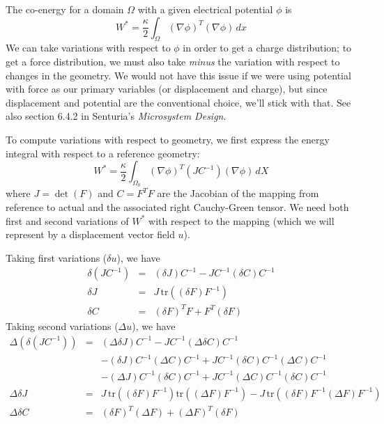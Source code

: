 \documentclass{article}
\begin{document}
The co-energy for a domain $\Omega$ with a given electrical
potential $\phi$ is
\[
W^* = \frac{\kappa}{2} 
\int_{\Omega} (\nabla \phi)^T (\nabla \phi) \, dx
\]
We can take variations with respect to $\phi$ in order to
get a charge distribution; to get a force distribution, we must also
take {\em minus} the variation with respect to changes in the
geometry.  We would not have this issue if we were using potential
with force as our primary variables (or displacement and charge),
but since displacement and potential are the conventional choice,
we'll stick with that.  See also section 6.4.2 in Senturia's
{\em Microsystem Design}.

To compute variations with respect to geometry, we first express
the energy integral with respect to a reference geometry:
\[
W^* = \frac{\kappa}{2} 
\int_{\Omega_0} (\nabla \phi)^T (JC^{-1}) (\nabla \phi) \, dX
\]
where $J = \det(F)$ and $C = F^T F$ are the Jacobian of the mapping from
reference to actual and the associated right Cauchy-Green tensor.
We need both first and second variations of $W^*$ with respect to the
mapping (which we will represent by a displacement vector field $u$).

Taking first variations ($\delta u$), we have
\begin{eqnarray*}
\delta (JC^{-1}) & = & (\delta J) C^{-1} - J C^{-1} (\delta C) C^{-1} \\
\delta J         & = & J \, \mathrm{tr}((\delta F) F^{-1}) \\
\delta C         & = & (\delta F)^T F + F^T (\delta F)
\end{eqnarray*}
Taking second variations ($\Delta u$), we have
\begin{eqnarray*}
\Delta (\delta (JC^{-1})) 
& = & (\Delta \delta J) C^{-1} 
- J C^{-1} (\Delta \delta C) C^{-1}  \\
&   & - (\delta J) C^{-1} (\Delta C) C^{-1}
+ J C^{-1} (\delta C) C^{-1} (\Delta C) C^{-1} \\
&   & - (\Delta J) C^{-1} (\delta C) C^{-1} 
+ J C^{-1} (\Delta C) C^{-1} (\delta C) C^{-1} \\
\Delta \delta J 
& = & J \, \mathrm{tr}((\delta F) F^{-1}) \mathrm{tr}((\Delta F) F^{-1}) - 
J \, \mathrm{tr}((\delta F) F^{-1} (\Delta F) F^{-1}) \\
\Delta \delta C 
& = & (\delta F)^T (\Delta F) + (\Delta F)^T (\delta F)
\end{eqnarray*}
\end{document}
